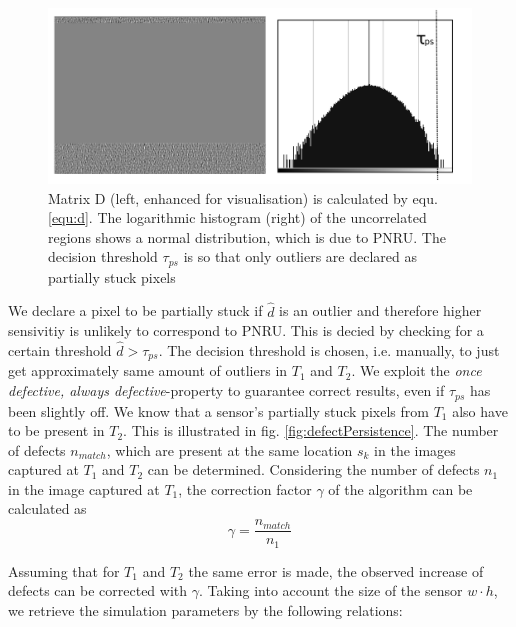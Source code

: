 \documentclass[10pt,twocolumn,letterpaper]{article}
\begin{document}
\begin{figure}[h]
  \centering
  \includegraphics[width=\linewidth]{img/defectMatWithTau.png}
  \caption{Matrix D (left, enhanced for visualisation) is calculated by equ. \ref{equ:d}. The logarithmic histogram (right) of the uncorrelated regions shows a normal distribution, which is due to PNRU. The decision threshold $\tau_{ps}$ is so that only outliers are declared as partially stuck pixels}
  \label{fig:defectMat}
\end{figure}


We declare a pixel to be partially stuck if $\hat{d}$ is an outlier and therefore higher sensivitiy is unlikely to correspond to PNRU. This is decied by checking for a certain threshold $\hat{d} > \tau_{ps}$. The decision threshold is chosen, i.e. manually, to just get approximately same amount of outliers in $T_1$ and $T_2$. We exploit the \emph{once defective, always defective}-property to guarantee correct results, even if $\tau_{ps}$ has been slightly off. We know that a sensor's partially stuck pixels from $T_1$ also have to be present in $T_2$. This is illustrated in fig. \ref{fig:defectPersistence}. The number of defects $n_{match}$, which are present at the same location $s_k$ in the images captured at $T_1$ and $T_2$ can be determined. Considering the number of defects $n_1$ in the image captured at $T_1$, the correction factor $\gamma$ of the algorithm can be calculated as
\begin{equation}
\gamma = \frac{n_{match}}{n_1}
\end{equation}

Assuming that for $T_1$ and $T_2$ the same error is made, the observed increase of defects can be corrected with $\gamma$. Taking into account the size of the sensor $w\cdot h$, we retrieve the simulation parameters by the following relations: 
\end{document}
